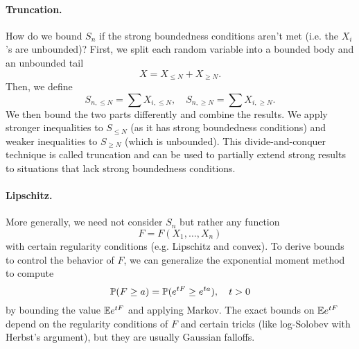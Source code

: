 \paragraph{Truncation.} How do we bound $S_n$ if the strong boundedness conditions aren't met (i.e. the $X_i$'s are unbounded)? First, we split each random variable into a bounded body and an unbounded tail
\[
    X = X_{\leq N} + X_{\geq N}.
\]
Then, we define
\[
    S_{n, \leq N} = \sum X_{i, \leq N}, \quad S_{n, \geq N} = \sum X_{i, \geq N}.
\]
We then bound the two parts differently and combine the results. We apply stronger inequalities to $S_{\leq N}$ (as it has strong boundedness conditions) and weaker inequalities to $S_{\geq N}$ (which is unbounded). This divide-and-conquer technique is called truncation and can be used to partially extend strong results to situations that lack strong boundedness conditions.

\paragraph{Lipschitz.} More generally, we need not consider $S_n$ but rather any function
\[
    F = F(X_1, \dots, X_n)
\]
with certain regularity conditions (e.g. Lipschitz and convex). To derive bounds to control the behavior of $F$, we can generalize the exponential moment method to compute
\[
    {\mathbb P}(F \geq a) = {\mathbb P}(e^{tF} \geq e^{ta}), \quad t > 0
\]
by bounding the value ${\mathbb E} e^{tF}$ and applying Markov. The exact bounds on ${\mathbb E} e^{tF}$ depend on the regularity conditions of $F$ and certain tricks (like log-Solobev with Herbst's argument), but they are usually Gaussian falloffs.

